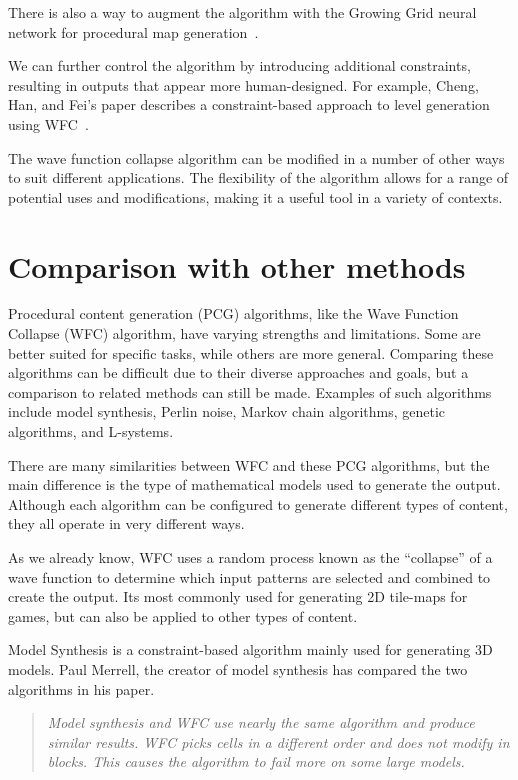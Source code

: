 \documentclass[10pt,oneside,a4paper]{article}
\begin{document}
There is also a way to augment the algorithm with the Growing Grid neural network for procedural map generation~\cite{NMBP20}.

We can further control the algorithm by introducing additional constraints, resulting in outputs that appear more human-designed.
For example, Cheng, Han, and Fei's paper describes a constraint-based approach to level generation using WFC~\cite{CHF20}.

The wave function collapse algorithm can be modified in a number of other ways to suit different applications.
The flexibility of the algorithm allows for a range of potential uses and modifications, making it a useful tool in a variety of contexts.

\section{Comparison with other methods}\label{sec:comparison}

Procedural content generation (PCG) algorithms, like the Wave Function Collapse (WFC) algorithm, have varying strengths and limitations.
Some are better suited for specific tasks, while others are more general.
Comparing these algorithms can be difficult due to their diverse approaches and goals, but a comparison to related methods can still be made.
Examples of such algorithms include model synthesis, Perlin noise, Markov chain algorithms, genetic algorithms, and L-systems.

There are many similarities between WFC and these PCG algorithms, but the main difference is the type of mathematical models used to generate the output.
Although each algorithm can be configured to generate different types of content, they all operate in very different ways.

As we already know, WFC uses a random process known as the ``collapse'' of a wave function to determine which input patterns are selected and combined to create the output.
Its most commonly used for generating 2D tile-maps for games, but can also be applied to other types of content.

Model Synthesis is a constraint-based algorithm mainly used for generating 3D models.
Paul Merrell, the creator of model synthesis has compared the two algorithms in his paper\cite{Mer21}.
\begin{quote}
    \textit{Model synthesis and WFC use nearly the same algorithm and produce similar results. WFC picks cells in a different
order and does not modify in blocks. This causes the algorithm to fail more on some large models.}
\end{quote}
\end{document}
